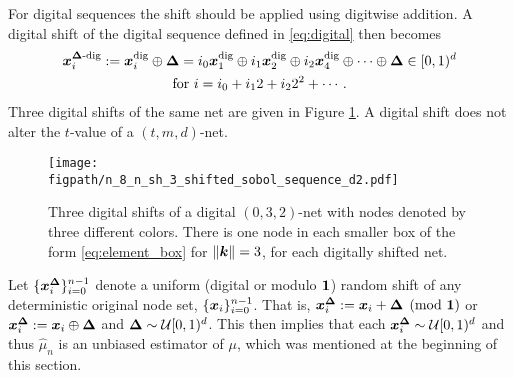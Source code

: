 \documentclass{svproc}
\newcommand{\figpath}{Figures}
\begin{document}
For digital sequences the shift should be applied using digitwise addition.  A digital shift of the digital sequence defined in  \eqref{eq:digital} then becomes
\begin{multline} \label{eq:sh_digital}
	{\boldsymbol{x}}_i^{{\boldsymbol{\Delta}}\text{-dig}} := {\boldsymbol{x}}_i^{\text{dig}} \oplus {\boldsymbol{\Delta}} = i_0 {\boldsymbol{x}}^{\text{dig}}_1 \oplus i_1 {\boldsymbol{x}}^{\text{dig}}_2 \oplus i_2 {\boldsymbol{x}}^{\text{dig}}_4 \oplus \cdots \oplus {\boldsymbol{\Delta}} \in [0,1)^d \\
    \text{for }
	i = i_0 + i_12 + i_2 2^2 + \cdots.
\end{multline}
Three digital shifts of the same net are given in Figure \ref{fig:shift_net}.  A digital shift does not alter the $t$-value of a $(t,m,d)$-net.

\begin{figure}
	\centering
	\texttt{[image: \\figpath/n\_8\_n\_sh\_3\_shifted\_sobol\_sequence\_d2.pdf]}
	\caption{Three digital shifts of a digital $(0,3,2)$-net with nodes denoted by three different colors.  There is one node in each smaller box of the form \eqref{eq:element_box} for $\lVert {\boldsymbol{k}} \rVert = 3$, for each digitally shifted net. \label{fig:shift_net}}
\end{figure}

Let $\{{\boldsymbol{x}}_i^{{\boldsymbol{\Delta}}}\}_{i=0}^{n-1}$ denote a uniform (digital or modulo ${\boldsymbol{1}}$) random shift of any deterministic original node set, $\{{\boldsymbol{x}}_i \}_{i=0}^{n-1}$.  That is, ${\boldsymbol{x}}_i^{{\boldsymbol{\Delta}}} : = {\boldsymbol{x}}_i + {\boldsymbol{\Delta}} \pmod {{\boldsymbol{1}}}$ or  ${\boldsymbol{x}}_i^{{\boldsymbol{\Delta}}} : = {\boldsymbol{x}}_i \oplus {\boldsymbol{\Delta}}$ and ${\boldsymbol{\Delta}} \sim {\mathcal{U}}[0,1)^d$. This then implies that each ${\boldsymbol{x}}_i^{{\boldsymbol{\Delta}}} \sim {\mathcal{U}}[0,1)^d$ and thus $\hat{\mu}_n$ is an unbiased estimator of $\mu$, which was mentioned at the beginning of this section.
\end{document}
